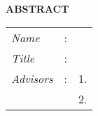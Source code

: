 \begin{center}
  \large\textbf{ABSTRACT}
\end{center}


\vspace{2ex}

\begingroup
\setlength{\tabcolsep}{0pt}

\noindent
\begin{tabularx}{\textwidth}{l >{\centering}m{3em} X}
  \emph{Name}     & : & \name{}         \\

  \emph{Title}    & : & \engtatitle{}   \\

  \emph{Advisors} & : & 1. \advisor{}   \\
                  &   & 2. \coadvisor{} \\
\end{tabularx}
\endgroup

